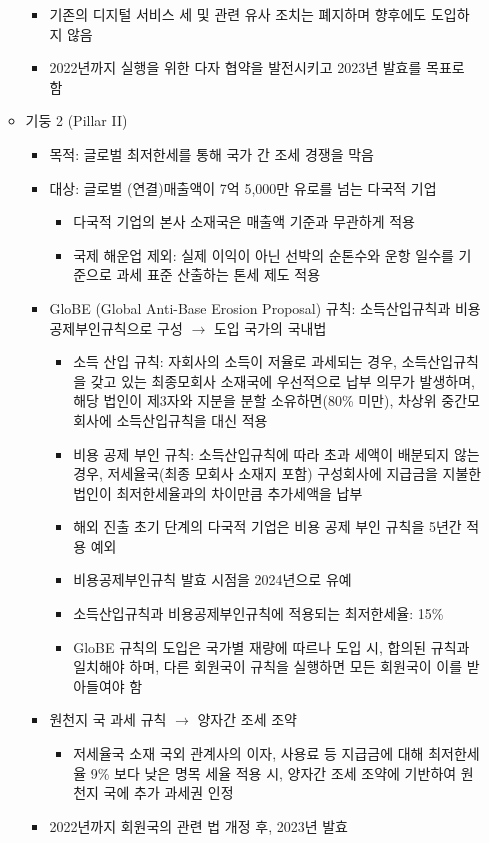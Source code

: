 \begin{itemize}
\begin{itemize}
\begin{itemize}
		\item 기존의 디지털 서비스 세 및 관련 유사 조치는 폐지하며 향후에도 도입하지 않음
		\item 2022년까지 실행을 위한 다자 협약을 발전시키고 2023년 발효를 목표로 함
		\end{itemize}
	\item 기둥 2 (Pillar II) 
		\begin{itemize}
		\item 목적: 글로벌 최저한세를 통해 국가 간 조세 경쟁을 막음
		\item 대상: 글로벌 (연결)매출액이 7억 5,000만 유로를 넘는 다국적 기업
			\begin{itemize}
			\item 다국적 기업의 본사 소재국은 매출액 기준과 무관하게 적용
			\item 국제 해운업 제외: 실제 이익이 아닌 선박의 순톤수와 운항 일수를 기준으로 과세 표준 산출하는 톤세 제도 적용
			\end{itemize}
		\item GloBE (Global Anti-Base Erosion Proposal) 규칙: 소득산입규칙과 비용공제부인규칙으로 구성 $\rightarrow$ 도입 국가의 국내법
			\begin{itemize}
			\item 소득 산입 규칙: 자회사의 소득이 저율로 과세되는 경우, 소득산입규칙을 갖고 있는 최종모회사 소재국에 우선적으로 납부 의무가 발생하며, 해당 법인이 제3자와 지분을 분할 소유하면(80\% 미만), 차상위 중간모회사에 소득산입규칙을 대신 적용
			\item 비용 공제 부인 규칙: 소득산입규칙에 따라 초과 세액이 배분되지 않는 경우, 저세율국(최종 모회사 소재지 포함) 구성회사에 지급금을 지불한 법인이 최저한세율과의 차이만큼 추가세액을 납부
			\item 해외 진출 초기 단계의 다국적 기업은 비용 공제 부인 규칙을 5년간 적용 예외
			\item 비용공제부인규칙 발효 시점을 2024년으로 유예
			\item 소득산입규칙과 비용공제부인규칙에 적용되는 최저한세율: 15\%
			\item GloBE 규칙의 도입은 국가별 재량에 따르나 도입 시, 합의된 규칙과 일치해야 하며, 다른 회원국이 규칙을 실행하면 모든 회원국이 이를 받아들여야 함	
			\end{itemize}
		\item 원천지 국 과세 규칙  $\rightarrow$ 양자간 조세 조약
			\begin{itemize}
			\item 저세율국 소재 국외 관계사의 이자, 사용료 등 지급금에 대해 최저한세율 9\% 보다 낮은 명목 세율 적용 시, 양자간 조세 조약에 기반하여 원천지 국에 추가 과세권 인정
			\end{itemize}
		\item 2022년까지 회원국의 관련 법 개정 후, 2023년 발효	
		\end{itemize}
	\end{itemize}
\end{itemize}

